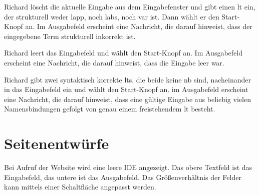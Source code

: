 \documentclass[parskip=full,11pt,twoside]{scrartcl}
\begin{document}
{Richard löscht die aktuelle Eingabe aus dem Eingabefenster und gibt einen \gls{lt} ein, der strukturell weder \gls{lapp}, noch
\gls{labs}, noch \gls{var} ist. Dann wählt er den Start-Knopf an.}
{Im Ausgabefeld erscheint eine Nachricht, die darauf hinweist, dass der eingegebene
Term strukturell inkorrekt ist.}

{Richard leert das Eingabefeld und wählt den Start-Knopf an.}
{Im Ausgabefeld erscheint eine Nachricht, die darauf hinweist, dass die Eingabe leer war.}

{Richard gibt zwei syntaktisch korrekte \glspl{lt}, die beide keine \gls{nb} sind, nacheinander
in das Eingabefeld ein und wählt den Start-Knopf an.}
{im Ausgabefeld erscheint eine Nachricht, die darauf hinweist, dass eine gültige Eingabe
aus beliebig vielen Namensbindungen gefolgt von genau einem freistehendem \gls{lt} besteht.}
%
%
%

\pagebreak
\appendix

\section{Seitenentwürfe}


Bei Aufruf der Website wird eine leere IDE angezeigt. Das obere Textfeld ist das Eingabefeld, das untere ist das Ausgabefeld. Das Größenverhältnis der Felder kann mittels einer Schaltfläche angepasst werden.
\end{document}
